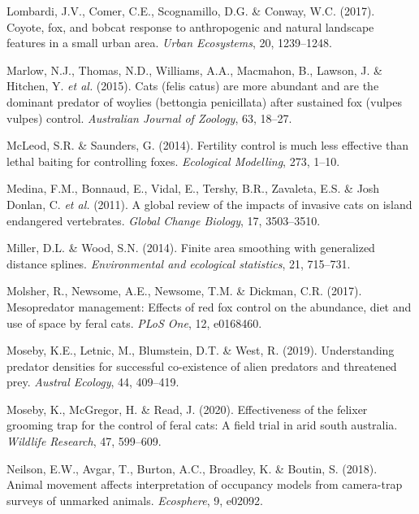 \documentclass[]{elsarticle} %
\begin{document}
\leavevmode\hypertarget{ref-lombardi2017coyote}{}%
Lombardi, J.V., Comer, C.E., Scognamillo, D.G. \& Conway, W.C. (2017). Coyote, fox, and bobcat response to anthropogenic and natural landscape features in a small urban area. \emph{Urban Ecosystems}, 20, 1239--1248.

\leavevmode\hypertarget{ref-marlow2015}{}%
Marlow, N.J., Thomas, N.D., Williams, A.A., Macmahon, B., Lawson, J. \& Hitchen, Y. \emph{et al.} (2015). Cats (felis catus) are more abundant and are the dominant predator of woylies (bettongia penicillata) after sustained fox (vulpes vulpes) control. \emph{Australian Journal of Zoology}, 63, 18--27.

\leavevmode\hypertarget{ref-mcleod2014}{}%
McLeod, S.R. \& Saunders, G. (2014). Fertility control is much less effective than lethal baiting for controlling foxes. \emph{Ecological Modelling}, 273, 1--10.

\leavevmode\hypertarget{ref-medina2011}{}%
Medina, F.M., Bonnaud, E., Vidal, E., Tershy, B.R., Zavaleta, E.S. \& Josh Donlan, C. \emph{et al.} (2011). A global review of the impacts of invasive cats on island endangered vertebrates. \emph{Global Change Biology}, 17, 3503--3510.

\leavevmode\hypertarget{ref-miller2014}{}%
Miller, D.L. \& Wood, S.N. (2014). Finite area smoothing with generalized distance splines. \emph{Environmental and ecological statistics}, 21, 715--731.

\leavevmode\hypertarget{ref-molsher2017}{}%
Molsher, R., Newsome, A.E., Newsome, T.M. \& Dickman, C.R. (2017). Mesopredator management: Effects of red fox control on the abundance, diet and use of space by feral cats. \emph{PLoS One}, 12, e0168460.

\leavevmode\hypertarget{ref-moseby2019}{}%
Moseby, K.E., Letnic, M., Blumstein, D.T. \& West, R. (2019). Understanding predator densities for successful co-existence of alien predators and threatened prey. \emph{Austral Ecology}, 44, 409--419.

\leavevmode\hypertarget{ref-moseby2020effectiveness}{}%
Moseby, K., McGregor, H. \& Read, J. (2020). Effectiveness of the felixer grooming trap for the control of feral cats: A field trial in arid south australia. \emph{Wildlife Research}, 47, 599--609.

\leavevmode\hypertarget{ref-https:ux2fux2fdoi.orgux2f10.1002ux2fecs2.2092}{}%
Neilson, E.W., Avgar, T., Burton, A.C., Broadley, K. \& Boutin, S. (2018). Animal movement affects interpretation of occupancy models from camera-trap surveys of unmarked animals. \emph{Ecosphere}, 9, e02092.
\end{document}
